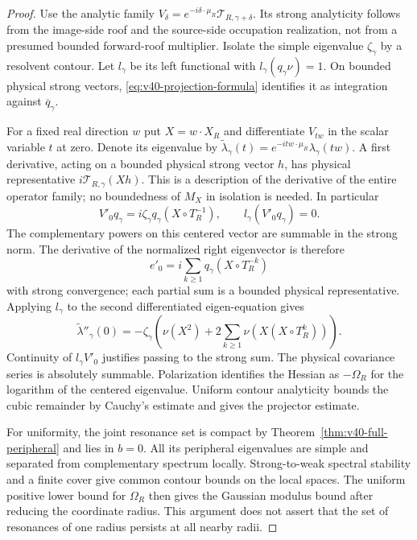 \begin{proof}
Use the analytic family
$V_\delta=e^{-i\delta\cdot\mu_R}\mathscr T_{R,\gamma+\delta}$.
Its strong analyticity follows from the image-side roof and the
source-side occupation realization, not from a presumed bounded
forward-roof multiplier. Isolate the simple eigenvalue
$\zeta_\gamma$ by a resolvent contour. Let $l_\gamma$ be its left
functional with $l_\gamma(q_\gamma\nu)=1$. On bounded physical
strong vectors, \eqref{eq:v40-projection-formula} identifies it as
integration against $\overline q_\gamma$.

For a fixed real direction $w$ put $X=w\cdot X_R$ and differentiate
$V_{tw}$ in the scalar variable $t$ at zero. Denote its eigenvalue by
$\widetilde\lambda_\gamma(t)=e^{-itw\cdot\mu_R}\lambda_\gamma(tw)$. A first derivative, acting on a bounded physical
strong vector $h$, has physical representative
$i\mathscr T_{R,\gamma}(Xh)$. This is a description of the derivative
of the entire operator family; no boundedness of $M_X$ in isolation
is needed. In particular
\[
 V'_0q_\gamma=i\zeta_\gamma q_\gamma(X\circ T_R^{-1}),
 \qquad l_\gamma(V'_0q_\gamma)=0.
\]
The complementary powers on this centered vector are summable in the
strong norm. The derivative of the normalized right eigenvector is
therefore
\[
 e'_0=i\sum_{k\ge1}q_\gamma(X\circ T_R^{-k})
\]
with strong convergence; each partial sum is a bounded physical
representative. Applying $l_\gamma$ to the second differentiated
eigen-equation gives
\[
 \widetilde\lambda''_\gamma(0)
   =-\zeta_\gamma\left(\nu(X^2)
             +2\sum_{k\ge1}\nu(X(X\circ T_R^k))\right).
\]
Continuity of $l_\gamma V'_0$ justifies passing to the strong sum.
The physical covariance series is absolutely summable. Polarization
identifies the Hessian as $-\Omega_R$ for the logarithm of the
centered eigenvalue. Uniform contour analyticity bounds the cubic
remainder by Cauchy's estimate and gives the projector estimate.

For uniformity, the joint resonance set is compact by
Theorem~\ref{thm:v40-full-peripheral} and lies in $b=0$. All its
peripheral eigenvalues are simple and separated from complementary
spectrum locally. Strong-to-weak spectral stability and a finite
cover give common contour bounds on the local spaces. The uniform
positive lower bound for $\Omega_R$ then gives the Gaussian modulus
bound after reducing the coordinate radius. This argument does not
assert that the set of resonances of one radius persists at all
nearby radii.
\end{proof}
